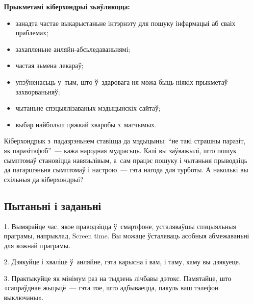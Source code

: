 \textbf{Прыкметамі кіберхондрыі зьяўляюцца:} 
\begin{itemize}
  \item занадта частае выкарыстаньне інтэрнэту для пошуку інфармацыі аб сваіх праблемах;
  \item захапленьне анляйн-абсьледаваньнямі;
  \item частая зьмена лекараў;
  \item упэўненасьць у~тым, што ў~здаровага ня можа быць ніякіх прыкметаў захворваньняў;
  \item чытаньне спэцыялізаваных мэдыцынскіх сайтаў;
  \item выбар найбольш цяжкай хваробы з~магчымых.
\end{itemize}

Кіберхондрык з~падазрэньнем ставіцца да мэдыцыны: ``не такі страшны паразіт, як паразітафоб''~--- кажа народная мудрасьць. Калі вы заўважылі, што пошук сымптомаў становіцца навязьлівым, а~сам працэс пошуку і чытаньня прыводзіць да пагаршэньня сымптомаў і настрою~--- гэта нагода для турботы. А наколькі вы схільныя да кіберхондрыі?

\subsection*{Пытаньні і заданьні}

1. Вымярайце час, якое праводзіцца ў~смартфоне, усталяваўшы спэцыяльныя праграмы, напрыклад, Screen time. Вы можаце ўсталяваць асобныя абмежаваньні для кожнай праграмы.

2. Дзякуйце і хваліце ў~анляйне, гэта карысна і вам, і таму, каму вы дзякуеце.

3. Практыкуйце як мінімум раз на тыдзень лічбавы дэтокс. Памятайце, што «сапраўднае жыцьцё~--- гэта тое, што адбываецца, пакуль ваш тэлефон выключаны».

